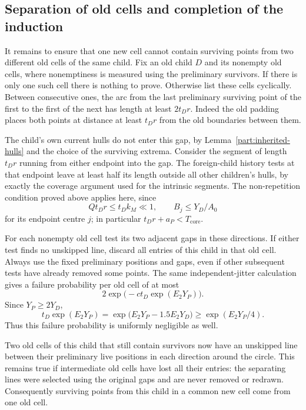\subsection{Separation of old cells and completion of the induction}

It remains to ensure that one new cell cannot contain surviving
points from two different old cells of the same child.  Fix an
old child $D$ and its nonempty old cells, where nonemptiness is
measured using the preliminary survivors.  If there is only one
such cell there is nothing to prove.  Otherwise list these cells
cyclically.  Between consecutive ones, the arc from the last
preliminary surviving point of the first to the first of the
next has length at least $2t_Dr$.  Indeed the old padding places
both points at distance at least $t_Dr$ from the old boundaries
between them.

The child's own current hulls do not enter this gap, by
Lemma~\ref{part:inherited-hulls} and the choice of the surviving
extrema.  Consider the segment of length $t_Dr$ running from
either endpoint into the gap.  The foreign-child history tests
at that endpoint leave at least half its length outside all
other children's hulls, by exactly the coverage argument used
for the intrinsic segments.  The non-repetition condition proved
above applies here, since
\[
 Qt_Dr\le t_Dk_M\ll1,
 \qquad B_j\le Y_D/A_0
\]
for its endpoint centre $j$; in particular $t_Dr+a_P<T_{\mathrm{core}}$.

For each nonempty old cell test its two adjacent gaps in these
directions.  If either test finds no unskipped line, discard all
entries of this child in that old cell.  Always use the fixed
preliminary positions and gaps, even if other subsequent tests
have already removed some points.  The same independent-jitter
calculation gives a failure probability per old cell of at most
\begin{equation}
 2\exp\bigl(-c t_D\exp(E_2Y_P)\bigr).
\label{part:child-jitter}
\end{equation}
Since $Y_P\ge2Y_D$,
\[
 t_D\exp(E_2Y_P)
   =\exp\bigl(E_2Y_P-1.5E_2Y_D\bigr)
   \ge\exp(E_2Y_P/4).
\]
Thus this failure probability is uniformly negligible as well.

Two old cells of this child that still contain survivors now
have an unskipped line between their preliminary live positions
in each direction around the circle.  This remains true if
intermediate old cells have lost all their entries: the separating
lines were selected using the original gaps and are never
removed or redrawn.  Consequently surviving points from this
child in a common new cell come from one old cell.

